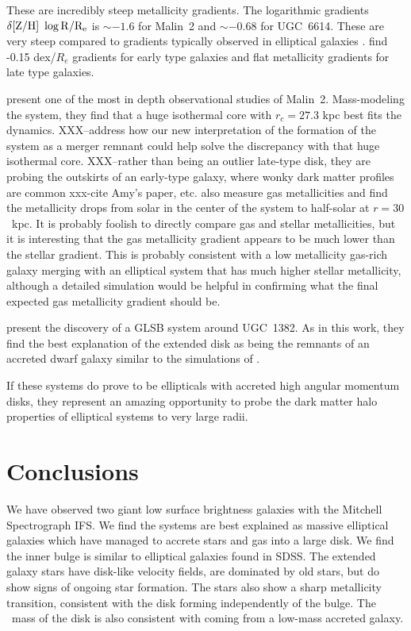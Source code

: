 \documentclass[12pt,preprint]{aastex}
\newcommand\HI{\ion{H}{1}}
\begin{document}
These are incredibly steep metallicity gradients.
The logarithmic gradients $\delta \rm{[Z/H]}\ \log{R/R_e}$ is $\sim -1.6$ for Malin~2 and $\sim -0.68$ for UGC~6614.
These are very steep compared to gradients typically observed in elliptical galaxies \citep{Kuntschner10, Greene12, Greene15}.
\citet{Wilkinson15} find -0.15 dex/$R_e$ gradients for early type galaxies and flat metallicity gradients for late type galaxies. 


\citet{Kasparova14} present one of the most in depth observational studies of Malin~2.
Mass-modeling the system, they find that a huge isothermal core with $r_c=27.3$ kpc best fits the dynamics.
XXX--address how our new interpretation of the formation of the system as a merger remnant could help solve the discrepancy with that huge isothermal core. 
XXX--rather than being an outlier late-type disk, they are probing the outskirts of an early-type galaxy, where wonky dark matter profiles are common xxx-cite Amy's paper, etc.
\citet{Kasparova14} also measure gas metallicities and find the metallicity drops from solar in the center of the system to half-solar at $r=30$\ kpc.
It is probably foolish to directly compare gas and stellar metallicities, but it is interesting that the gas metallicity gradient appears to be much lower than the stellar gradient.
This is probably consistent with a low metallicity gas-rich galaxy merging with an elliptical system that has much higher stellar metallicity, although a detailed simulation would be helpful in confirming what the final expected gas metallicity gradient should be.


\citet{Hagen16} present the discovery of a GLSB system around UGC~1382.
As in this work, they find the best explanation of the extended disk as being the remnants of an accreted dwarf galaxy similar to the simulations of \citet{Pen06}. 

If these systems do prove to be ellipticals with accreted high angular momentum disks, they represent an amazing opportunity to probe the dark matter halo properties of elliptical systems to very large radii. 


\section{Conclusions}\label{sec:conclusions}

We have observed two giant low surface brightness galaxies with the Mitchell Spectrograph IFS.
We find the systems are best explained as massive elliptical galaxies which have managed to accrete stars and gas into a large disk.
We find the inner bulge is similar to elliptical galaxies found in SDSS.
The extended galaxy stars have disk-like velocity fields, are dominated by old stars, but do show signs of ongoing star formation. The stars also show a sharp metallicity transition, consistent with the disk forming independently of the bulge. The \HI\ mass of the disk is also consistent with coming from a low-mass accreted galaxy.
\end{document}
